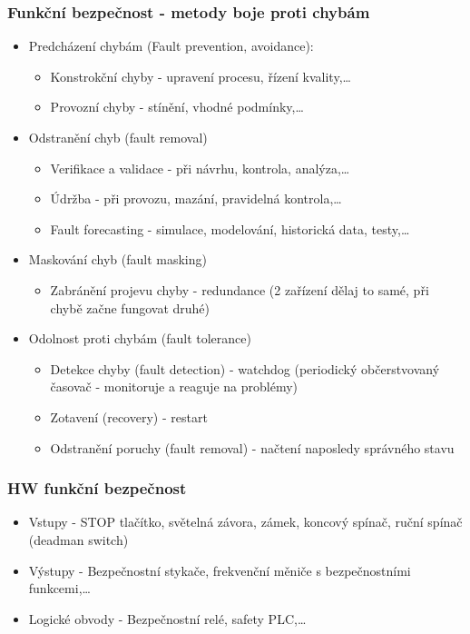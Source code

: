 \subsubsection*{Funkční bezpečnost - metody boje proti chybám}
\begin{itemize}
    \item Predcházení chybám (Fault prevention, avoidance): \begin{itemize}
              \item Konstrokční chyby - upravení procesu, řízení kvality,\dots
              \item Provozní chyby - stínění, vhodné podmínky,\dots
          \end{itemize}
    \item Odstranění chyb (fault removal) \begin{itemize}
              \item Verifikace a validace - při návrhu, kontrola, analýza,\dots
              \item Údržba - při provozu, mazání, pravidelná kontrola,\dots
              \item Fault forecasting - simulace, modelování, historická data, testy,\dots
          \end{itemize}
    \item Maskování chyb (fault masking) \begin{itemize}
              \item Zabránění projevu chyby - redundance (2 zařízení dělaj to samé, při chybě začne fungovat druhé)
          \end{itemize}
    \item Odolnost proti chybám (fault tolerance) \begin{itemize}
              \item Detekce chyby (fault detection) - watchdog (periodický občerstvovaný časovač - monitoruje a reaguje na problémy)
              \item Zotavení (recovery) - restart
              \item Odstranění poruchy (fault removal) - načtení naposledy správného stavu
          \end{itemize}
\end{itemize}

\subsubsection*{HW funkční bezpečnost}
\begin{itemize}
    \item Vstupy - STOP tlačítko, světelná závora, zámek, koncový spínač, ruční spínač (deadman switch)
    \item Výstupy - Bezpečnostní stykače, frekvenční měniče s bezpečnostními funkcemi,\dots
    \item Logické obvody - Bezpečnostní relé, safety PLC,\dots
\end{itemize}


